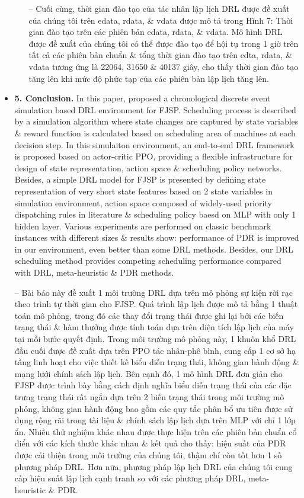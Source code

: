 \documentclass{article}
\begin{document}
\begin{itemize}
\begin{itemize}
        -- Cuối cùng, thời gian đào tạo của tác nhân lập lịch DRL được đề xuất của chúng tôi trên edata, rdata, \& vdata được mô tả trong {\sf Hình 7: Thời gian đào tạo trên các phiên bản edata, rdata, \& vdata.} Mô hình DRL được đề xuất của chúng tôi có thể được đào tạo để hội tụ trong 1 giờ trên tất cả các phiên bản chuẩn \& tổng thời gian đào tạo trên edta, rdata, \& vdata tương ứng là 22064, 31650 \& 40137 giây, cho thấy thời gian đào tạo tăng lên khi mức độ phức tạp của các phiên bản lập lịch tăng lên.
    \end{itemize}
    \item {\bf5. Conclusion.} In this paper, proposed a chronological discrete event simulation based DRL environment for FJSP. Scheduling process is described by a simulation algorithm where state changes are captured by state variables \& reward function is calculated based on scheduling area of machines at each decision step. In this simulaiton environment, an end-to-end DRL framework is proposed based on actor-critic PPO, providing a flexible infrastructure for design of state representation, action space \& scheduling policy networks. Besides, a simple DRL model for FJSP is presented by defining state representation of very short state features based on 2 state variables in simulation environment, action space composed of widely-used priority dispatching rules in literature \& scheduling policy baesd on MLP with only 1 hidden layer. Various experiments are performed on classic benchmark instances with different sizes \& results show: performance of PDR is improved in our environment, even better than some DRL methods. Besides, our DRL scheduling method provides competing scheduling performance compared with DRL, meta-heuristic \& PDR methods.

    -- Bài báo này đề xuất 1 môi trường DRL dựa trên mô phỏng sự kiện rời rạc theo trình tự thời gian cho FJSP. Quá trình lập lịch được mô tả bằng 1 thuật toán mô phỏng, trong đó các thay đổi trạng thái được ghi lại bởi các biến trạng thái \& hàm thưởng được tính toán dựa trên diện tích lập lịch của máy tại mỗi bước quyết định. Trong môi trường mô phỏng này, 1 khuôn khổ DRL đầu cuối được đề xuất dựa trên PPO tác nhân-phê bình, cung cấp 1 cơ sở hạ tầng linh hoạt cho việc thiết kế biểu diễn trạng thái, không gian hành động \& mạng lưới chính sách lập lịch. Bên cạnh đó, 1 mô hình DRL đơn giản cho FJSP được trình bày bằng cách định nghĩa biểu diễn trạng thái của các đặc trưng trạng thái rất ngắn dựa trên 2 biến trạng thái trong môi trường mô phỏng, không gian hành động bao gồm các quy tắc phân bổ ưu tiên được sử dụng rộng rãi trong tài liệu \& chính sách lập lịch dựa trên MLP với chỉ 1 lớp ẩn. Nhiều thử nghiệm khác nhau được thực hiện trên các phiên bản chuẩn cổ điển với các kích thước khác nhau \& kết quả cho thấy: hiệu suất của PDR được cải thiện trong môi trường của chúng tôi, thậm chí còn tốt hơn 1 số phương pháp DRL. Hơn nữa, phương pháp lập lịch DRL của chúng tôi cung cấp hiệu suất lập lịch cạnh tranh so với các phương pháp DRL, meta-heuristic \& PDR.


\end{itemize}
\end{document}
